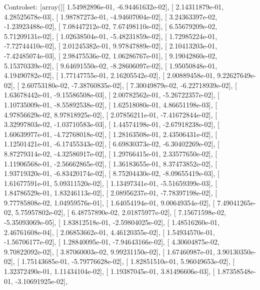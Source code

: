 \documentclass{article}
\begin{document}
Controlset: [array([[  1.54982896e-01,  -6.94461632e-02],
       [  2.14311879e-01,   4.28525678e-03],
       [  1.98787273e-01,  -4.94607004e-02],
       [  3.24363397e-02,  -1.23923488e-02],
       [  7.08447212e-02,   7.67498110e-02],
       [  6.55679209e-02,   5.71209131e-02],
       [  1.02638504e-01,  -5.48231859e-02],
       [  1.72985224e-01,  -7.72744410e-02],
       [  2.01245382e-01,   9.97847889e-02],
       [  2.10413203e-01,  -7.42485074e-03],
       [  2.98475536e-02,   1.06286767e-01],
       [  9.19042860e-02,   5.15370339e-02],
       [  9.64691550e-02,  -8.28606097e-02],
       [  1.95050848e-01,   4.19490782e-02],
       [  1.77147755e-01,   2.16205542e-02],
       [  2.00889458e-01,   9.22627649e-02],
       [  2.60753180e-02,  -7.38760835e-02],
       [  7.30049879e-02,  -6.22718939e-02],
       [  1.63678442e-01,  -9.15586508e-03],
       [  2.00782562e-01,  -5.26722357e-02],
       [  1.10735009e-01,  -8.55892538e-02],
       [  1.62518080e-01,   4.86651198e-03],
       [  4.97856629e-02,   8.97818925e-02],
       [  2.07856211e-01,  -7.41672844e-02],
       [  3.32997803e-02,  -1.03710583e-03],
       [  1.44574198e-01,  -2.67918238e-02],
       [  1.60639977e-01,  -4.72768018e-02],
       [  1.28163508e-01,   2.43506431e-02],
       [  1.12501421e-01,  -6.17455343e-02],
       [  6.69830373e-02,  -6.30402269e-02],
       [  8.87279314e-02,  -4.32586917e-02],
       [  1.29766415e-01,   2.33577650e-02],
       [  1.11906568e-01,  -2.56662865e-02],
       [  1.36183655e-01,   8.37473852e-02],
       [  1.93719320e-01,  -6.83420174e-02],
       [  8.75204430e-02,  -8.09655419e-03],
       [  1.61677591e-01,   5.09311520e-02],
       [  1.13497341e-01,  -5.51659399e-03],
       [  1.84786529e-01,   1.83246113e-02],
       [  2.08956237e-01,  -7.78397198e-02],
       [  9.77785808e-02,   1.04959576e-01],
       [  1.64054194e-01,   9.00649354e-02],
       [  7.49041265e-02,   5.75957802e-02],
       [  6.48757890e-02,   2.01875977e-02],
       [  7.15671598e-02,  -5.35093069e-05],
       [  1.83812518e-01,  -2.59804025e-02],
       [  1.48516260e-01,   2.46761608e-04],
       [  2.06853662e-01,   4.46120355e-02],
       [  1.54934570e-01,  -1.56706177e-02],
       [  1.28840095e-01,  -7.94643166e-02],
       [  4.30604875e-02,   9.70822092e-02],
       [  3.87060003e-02,   9.99231150e-02],
       [  1.67460987e-01,   3.90130350e-02],
       [  1.75143685e-01,  -5.79776628e-02],
       [  1.82851510e-01,   5.96049653e-02],
       [  1.32372490e-01,   1.11434104e-02],
       [  1.19387045e-01,   3.81496606e-03],
       [  1.87358548e-01,  -3.10691925e-02],
\end{document}
